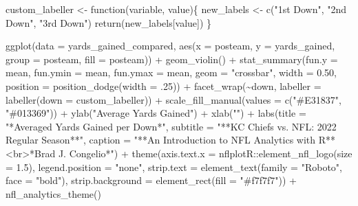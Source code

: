 \documentclass[
  letterpaper,
]{krantz}
\newenvironment{Shaded}{\begin{snugshade}}{\end{snugshade}}
\newcommand{\AttributeTok}[1]{\textcolor[rgb]{0.40,0.45,0.13}{#1}}
\newcommand{\ControlFlowTok}[1]{\textcolor[rgb]{0.00,0.23,0.31}{#1}}
\newcommand{\DecValTok}[1]{\textcolor[rgb]{0.68,0.00,0.00}{#1}}
\newcommand{\FloatTok}[1]{\textcolor[rgb]{0.68,0.00,0.00}{#1}}
\newcommand{\FunctionTok}[1]{\textcolor[rgb]{0.28,0.35,0.67}{#1}}
\newcommand{\NormalTok}[1]{\textcolor[rgb]{0.00,0.23,0.31}{#1}}
\newcommand{\OtherTok}[1]{\textcolor[rgb]{0.00,0.23,0.31}{#1}}
\newcommand{\SpecialCharTok}[1]{\textcolor[rgb]{0.37,0.37,0.37}{#1}}
\newcommand{\StringTok}[1]{\textcolor[rgb]{0.13,0.47,0.30}{#1}}
\begin{document}
\begin{Shaded}
\begin{Highlighting}[]
\NormalTok{custom\_labeller }\OtherTok{\textless{}{-}} \ControlFlowTok{function}\NormalTok{(variable, value)\{}
\NormalTok{  new\_labels }\OtherTok{\textless{}{-}} \FunctionTok{c}\NormalTok{(}\StringTok{"1st Down"}\NormalTok{, }\StringTok{"2nd Down"}\NormalTok{, }\StringTok{"3rd Down"}\NormalTok{)}
  \FunctionTok{return}\NormalTok{(new\_labels[value])}
\NormalTok{\}}

\FunctionTok{ggplot}\NormalTok{(}\AttributeTok{data =}\NormalTok{ yards\_gained\_compared, }\FunctionTok{aes}\NormalTok{(}\AttributeTok{x =}\NormalTok{ posteam,}
                                         \AttributeTok{y =}\NormalTok{ yards\_gained,}
                                         \AttributeTok{group =}\NormalTok{ posteam,}
                                         \AttributeTok{fill =}\NormalTok{ posteam)) }\SpecialCharTok{+}
  \FunctionTok{geom\_violin}\NormalTok{() }\SpecialCharTok{+}
  \FunctionTok{stat\_summary}\NormalTok{(}\AttributeTok{fun.y =}\NormalTok{ mean, }\AttributeTok{fun.ymin =}\NormalTok{ mean, }\AttributeTok{fun.ymax =}\NormalTok{ mean,}
               \AttributeTok{geom =} \StringTok{"crossbar"}\NormalTok{,}
               \AttributeTok{width =} \FloatTok{0.50}\NormalTok{,}
               \AttributeTok{position =} \FunctionTok{position\_dodge}\NormalTok{(}\AttributeTok{width =}\NormalTok{ .}\DecValTok{25}\NormalTok{)) }\SpecialCharTok{+}
  \FunctionTok{facet\_wrap}\NormalTok{(}\SpecialCharTok{\textasciitilde{}}\NormalTok{down, }\AttributeTok{labeller =} \FunctionTok{labeller}\NormalTok{(}\AttributeTok{down =}\NormalTok{ custom\_labeller)) }\SpecialCharTok{+}
  \FunctionTok{scale\_fill\_manual}\NormalTok{(}\AttributeTok{values =} \FunctionTok{c}\NormalTok{(}\StringTok{"\#E31837"}\NormalTok{, }\StringTok{"\#013369"}\NormalTok{)) }\SpecialCharTok{+}
  \FunctionTok{ylab}\NormalTok{(}\StringTok{"Average Yards Gained"}\NormalTok{) }\SpecialCharTok{+}
  \FunctionTok{xlab}\NormalTok{(}\StringTok{""}\NormalTok{) }\SpecialCharTok{+}
  \FunctionTok{labs}\NormalTok{(}\AttributeTok{title =} \StringTok{"*Averaged Yards Gained per Down*"}\NormalTok{,}
       \AttributeTok{subtitle =} \StringTok{"**KC Chiefs vs. NFL: 2022 Regular Season**"}\NormalTok{,}
       \AttributeTok{caption =} \StringTok{"**An Introduction to NFL Analytics with R**\textless{}br\textgreater{}*Brad J. Congelio*"}\NormalTok{) }\SpecialCharTok{+}
  \FunctionTok{theme}\NormalTok{(}\AttributeTok{axis.text.x =}\NormalTok{ nflplotR}\SpecialCharTok{::}\FunctionTok{element\_nfl\_logo}\NormalTok{(}\AttributeTok{size =} \FloatTok{1.5}\NormalTok{),}
        \AttributeTok{legend.position =} \StringTok{"none"}\NormalTok{,}
        \AttributeTok{strip.text =} \FunctionTok{element\_text}\NormalTok{(}\AttributeTok{family =} \StringTok{"Roboto"}\NormalTok{, }\AttributeTok{face =} \StringTok{"bold"}\NormalTok{),}
        \AttributeTok{strip.background =} \FunctionTok{element\_rect}\NormalTok{(}\AttributeTok{fill =} \StringTok{"\#f7f7f7"}\NormalTok{)) }\SpecialCharTok{+}
  \FunctionTok{nfl\_analytics\_theme}\NormalTok{()}
\end{Highlighting}
\end{Shaded}
\end{document}

